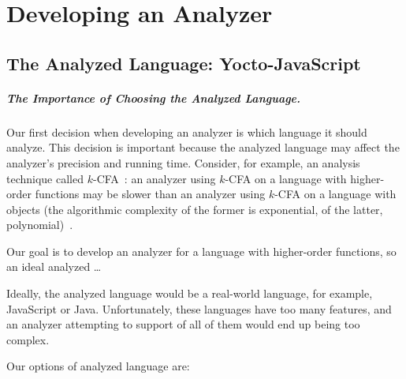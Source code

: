 \documentclass[12pt, oneside]{book}
\begin{document}
\chapter{Developing an Analyzer}


\section{The Analyzed Language: Yocto-JavaScript}

\paragraph{The Importance of Choosing the Analyzed Language.}

Our first decision when developing an analyzer is which language it should analyze. This decision is important because the analyzed language may affect the analyzer’s precision and running time. Consider, for example, an analysis technique called \(k\)-CFA~\cite{k-cfa}: an analyzer using \(k\)-CFA on a language with higher-order functions may be slower than an analyzer using \(k\)-CFA on a language with objects (the algorithmic complexity of the former is exponential, of the latter, polynomial)~\cite{m-cfa}.

Our goal is to develop an analyzer for a language with higher-order functions, so an ideal analyzed …

Ideally, the analyzed language would be a real-world language, for example, JavaScript or Java. Unfortunately, these languages have too many features, and an analyzer attempting to support of all of them would end up being too complex.

Our options of analyzed language are:
\end{document}
